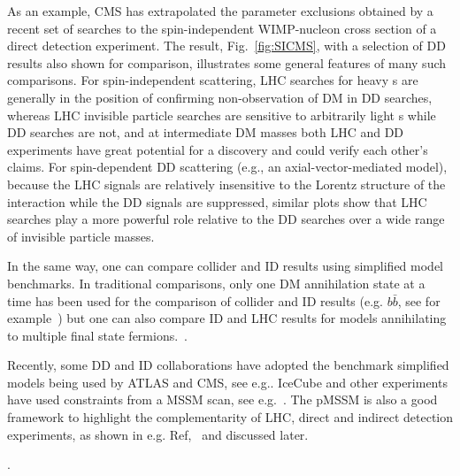 As an example, CMS has extrapolated the parameter exclusions obtained by a recent set of searches to the spin-independent WIMP-nucleon cross section of a direct detection experiment.
The result, Fig.~\ref{fig:SICMS}, with a selection of DD results also shown for comparison, illustrates some general features of many such comparisons.
For spin-independent scattering, LHC searches for heavy {\IP}s are generally in the position of confirming non-observation of DM in DD searches, whereas LHC invisible particle searches are sensitive to arbitrarily light {\IP}s while DD searches are not, and at intermediate DM masses both LHC and DD experiments have great potential for a discovery and could verify each other's claims.
For spin-dependent DD scattering (e.g., an axial-vector-mediated model), because the LHC signals are relatively insensitive to the Lorentz structure of the interaction while the DD signals are suppressed, similar plots show that LHC searches play a more powerful role relative to the DD searches over a wide range of invisible particle masses. 

In the same way, one can compare collider and ID results using simplified model benchmarks. In traditional comparisons, only one DM annihilation state at a time has been used for the comparison of collider and ID results (e.g. $b\bar{b}$, see for example~\cite{Agrawal:2014una}) but one can also compare ID and LHC results for models annihilating to multiple final state fermions.~\cite{Carpenter:2016thc}.

Recently, some DD and ID collaborations have adopted the benchmark simplified models being used by ATLAS and CMS, see e.g.\cite{PhysRevLett.118.251301,Balazs:2017hxh}.
IceCube and other experiments have used constraints from a MSSM scan, see e.g.~\cite{Aartsen:2016zhm}. The pMSSM is also a good framework to highlight the complementarity of LHC, direct and indirect detection experiments, as shown in e.g. Ref,~\cite{Cahill-Rowley:2014twa} and discussed later. %


\begin{marginnote}[]
\end{marginnote}. 

